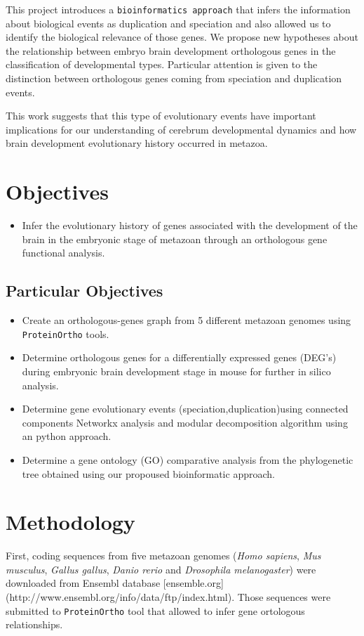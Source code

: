 \documentclass[a4paper]{article}
\begin{document}
This project introduces a \texttt{bioinformatics approach} that infers the information about biological events as duplication and speciation and also allowed us to identify the biological relevance of those genes. We propose new hypotheses about the relationship between embryo brain development orthologous genes in the classification of developmental types. Particular attention is given to the distinction between orthologous genes coming from speciation and duplication events. 

This work suggests that this type of evolutionary events have important implications for our understanding of cerebrum developmental dynamics and how brain development evolutionary history occurred in metazoa. 



\section*{Objectives}
\begin{itemize}
	\item  Infer the evolutionary history of genes associated with the development of the brain in the embryonic stage of metazoan through an orthologous gene functional analysis.
\end{itemize}

\subsection*{Particular Objectives}
\begin{itemize}
	\item Create an orthologous-genes graph from 5 different metazoan genomes using  \texttt{ProteinOrtho} tools.
    \item Determine orthologous genes for a differentially expressed genes (DEG's) during embryonic brain development stage in mouse for further in silico analysis.
    \item Determine gene evolutionary events 	(speciation,duplication)using connected components Networkx analysis and modular decomposition algorithm using an python approach.
    \item Determine a gene ontology (GO) comparative analysis from the phylogenetic tree obtained using our propoused bioinformatic approach.
\end{itemize}

\section*{Methodology}
First, coding sequences from five metazoan genomes ({\it Homo sapiens}, {\it Mus musculus}, {\it Gallus gallus}, {\it Danio rerio} and  {\it Drosophila melanogaster}) were downloaded from Ensembl database
[ensemble.org](http://www.ensembl.org/info/data/ftp/index.html). Those sequences were submitted to \texttt{ProteinOrtho} tool that allowed to infer gene ortologous relationships.
\end{document}

